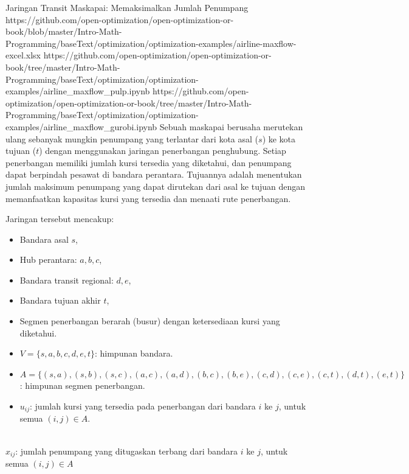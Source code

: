\begin{examplewithallcode}{Jaringan Transit Maskapai: Memaksimalkan Jumlah Penumpang}
{https://github.com/open-optimization/open-optimization-or-book/blob/master/Intro-Math-Programming/baseText/optimization/optimization-examples/airline-maxflow-excel.xlsx}
{https://github.com/open-optimization/open-optimization-or-book/tree/master/Intro-Math-Programming/baseText/optimization/optimization-examples/airline_maxflow_pulp.ipynb}
{https://github.com/open-optimization/open-optimization-or-book/tree/master/Intro-Math-Programming/baseText/optimization/optimization-examples/airline_maxflow_gurobi.ipynb}
Sebuah maskapai berusaha merutekan ulang sebanyak mungkin penumpang yang terlantar dari kota asal (\(s\)) ke kota tujuan (\(t\)) dengan menggunakan jaringan penerbangan penghubung. Setiap penerbangan memiliki jumlah kursi tersedia yang diketahui, dan penumpang dapat berpindah pesawat di bandara perantara. Tujuannya adalah menentukan jumlah maksimum penumpang yang dapat dirutekan dari asal ke tujuan dengan memanfaatkan kapasitas kursi yang tersedia dan menaati rute penerbangan.

\vspace{0.5em}
Jaringan tersebut mencakup:
\begin{itemize}
    \item Bandara asal \(s\),
    \item Hub perantara: \(a, b, c\),
    \item Bandara transit regional: \(d, e\),
    \item Bandara tujuan akhir \(t\),
    \item Segmen penerbangan berarah (busur) dengan ketersediaan kursi yang diketahui.
\end{itemize}

\smallskip {}
\begin{itemize}
    \item \( V = \{s, a, b, c, d, e, t\} \): himpunan bandara.
    \item \( A = \{(s,a), (s,b), (s,c), (a,c), (a,d), (b,c), (b,e), (c,d), (c,e), (c,t), (d,t), (e,t)\} \): himpunan segmen penerbangan.
    \item \( u_{ij} \): jumlah kursi yang tersedia pada penerbangan dari bandara \( i \) ke \( j \), untuk semua $(i,j) \in A$.
\end{itemize}

\smallskip {} \\
\( x_{ij} \): jumlah penumpang yang ditugaskan terbang dari bandara \( i \) ke \( j \), untuk semua $(i,j) \in A$


\end{examplewithallcode}
